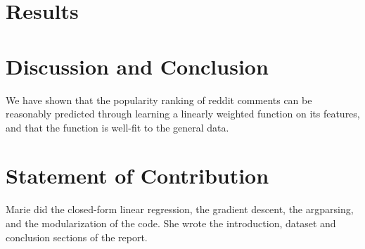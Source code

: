 \documentclass[11pt,letterpaper]{article}
\begin{document}
\section{Results}


\section{Discussion and Conclusion}


We have shown that the popularity ranking of reddit comments can be reasonably predicted through learning a linearly weighted function on its features, and that the function is well-fit to the general data.

\section{Statement of Contribution}
Marie did the closed-form linear regression, the gradient descent, the argparsing, and the modularization of the code. She wrote the introduction, dataset and conclusion sections of the report.



\end{document}
